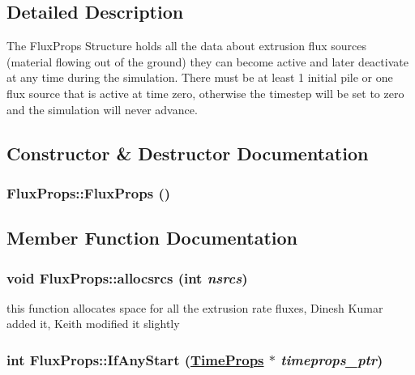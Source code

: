 \subsection{Detailed Description}
The Flux\-Props Structure holds all the data about extrusion flux sources (material flowing out of the ground) they can become active and later deactivate at any time during the simulation. There must be at least 1 initial pile or one flux source that is active at time zero, otherwise the timestep will be set to zero and the simulation will never advance. 



\subsection{Constructor \& Destructor Documentation}
\hypertarget{structFluxProps_a0}{
\subsubsection[FluxProps]{\setlength{\rightskip}{0pt plus 5cm}Flux\-Props::Flux\-Props ()}}
\label{structFluxProps_a0}




\subsection{Member Function Documentation}
\hypertarget{structFluxProps_a1}{
\subsubsection[allocsrcs]{\setlength{\rightskip}{0pt plus 5cm}void Flux\-Props::allocsrcs (int {\em nsrcs})}}
\label{structFluxProps_a1}


this function allocates space for all the extrusion rate fluxes, Dinesh Kumar added it, Keith modified it slightly 

\hypertarget{structFluxProps_a2}{
\subsubsection[IfAnyStart]{\setlength{\rightskip}{0pt plus 5cm}int Flux\-Props::If\-Any\-Start (\hyperlink{structTimeProps}{Time\-Props} $\ast$ {\em timeprops\_\-ptr})}}
\label{structFluxProps_a2}


